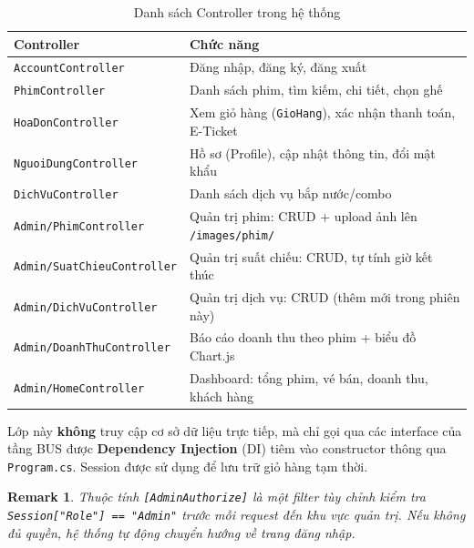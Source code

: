 \documentclass[12pt,a4paper,oneside]{book}
\theoremstyle{plain}
\newtheorem{rem}[thm]{Remark}
\numberwithin{equation}{chapter}
\begin{document}
\begin{table}[H]
    \begin{center}
        \begin{tabular}{|l|l|}
            \hline
            \textbf{Controller} & \textbf{Chức năng} \\
            \hline
            \texttt{AccountController}           & Đăng nhập, đăng ký, đăng xuất \\
            \hline
            \texttt{PhimController}              & Danh sách phim, tìm kiếm, chi tiết, chọn ghế \\
            \hline
            \texttt{HoaDonController}            & Xem giỏ hàng (\texttt{GioHang}), xác nhận thanh toán, E-Ticket \\
            \hline
            \texttt{NguoiDungController}         & Hồ sơ (Profile), cập nhật thông tin, đổi mật khẩu \\
            \hline
            \texttt{DichVuController}            & Danh sách dịch vụ bắp nước/combo \\
            \hline
            \texttt{Admin/PhimController}        & Quản trị phim: CRUD + upload ảnh lên \texttt{/images/phim/} \\
            \hline
            \texttt{Admin/SuatChieuController}   & Quản trị suất chiếu: CRUD, tự tính giờ kết thúc \\
            \hline
            \texttt{Admin/DichVuController}      & Quản trị dịch vụ: CRUD (thêm mới trong phiên này) \\
            \hline
            \texttt{Admin/DoanhThuController}    & Báo cáo doanh thu theo phim + biểu đồ Chart.js \\
            \hline
            \texttt{Admin/HomeController}        & Dashboard: tổng phim, vé bán, doanh thu, khách hàng \\
            \hline
        \end{tabular}
    \end{center}
    \caption{Danh sách Controller trong hệ thống}\label{table_controller}
\end{table}

\noindent Lớp này \textbf{không} truy cập cơ sở dữ liệu trực tiếp, mà chỉ gọi qua các interface của tầng BUS được \textbf{Dependency Injection} (DI) tiêm vào constructor thông qua \texttt{Program.cs}. Session được sử dụng để lưu trữ giỏ hàng tạm thời.

\begin{rem}
    Thuộc tính \texttt{[AdminAuthorize]} là một filter tùy chỉnh kiểm tra \texttt{Session["Role"] == "Admin"} trước mỗi request đến khu vực quản trị. Nếu không đủ quyền, hệ thống tự động chuyển hướng về trang đăng nhập.
\end{rem}
\end{document}
